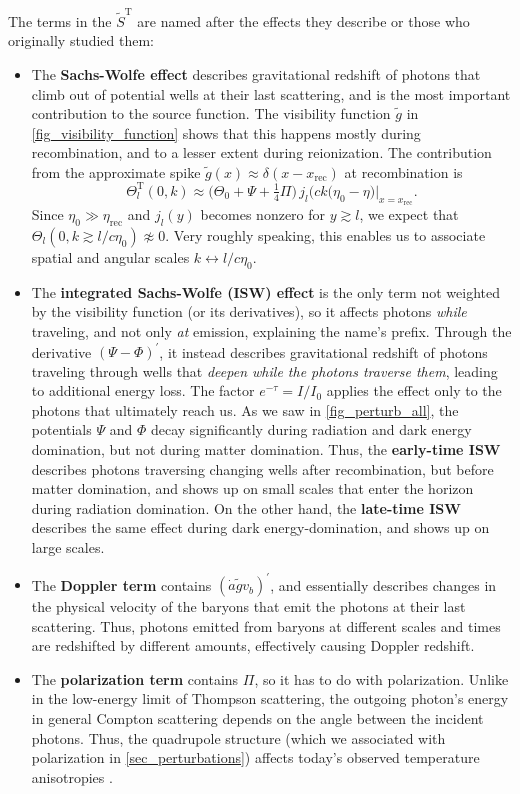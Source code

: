 \documentclass[10pt,a4paper]{article}
\begin{document}
The terms in the $\tilde{S}^\text{T}$ are named after the effects they describe or those who originally studied them:
\begin{itemize}
\item
The \textbf{Sachs-Wolfe effect} describes gravitational redshift of photons that climb out of potential wells at their last scattering,
and is the most important contribution to the source function.
The visibility function $\tilde{g}$ in \cref{fig_visibility_function} shows that this happens mostly during recombination,
and to a lesser extent during reionization.
The contribution from the approximate spike $\tilde{g}(x) \approx \delta(x-x_\text{rec})$ at recombination is
\begin{equation}
	\Theta^\text{T}_l(0,k) \approx \big(\Theta_0 + \Psi + \tfrac14 \Pi \big) \, j_l\big(ck(\eta_0-\eta\big) \Big|_{x=x_\text{rec}}.
\end{equation}
Since $\eta_0 \gg \eta_\text{rec}$ and $j_l(y)$ becomes nonzero for $y \gtrsim l$,
we expect that $\Theta_l(0,k \gtrsim l / c \eta_0) \not\approx 0$.
Very roughly speaking,
this enables us to associate spatial and angular scales $k \leftrightarrow l/c\eta_0$.

\item
The \textbf{integrated Sachs-Wolfe (ISW) effect} is the only term not weighted by the visibility function (or its derivatives),
so it affects photons \emph{while} traveling, and not only \emph{at} emission,
explaining the name's prefix.
Through the derivative $(\Psi-\Phi)^\prime$,
it instead describes gravitational redshift of photons traveling through wells that \emph{deepen while the photons traverse them},
leading to additional energy loss.
The factor $e^{-\tau} = I/I_0$ applies the effect only to the photons that ultimately reach us.
As we saw in \cref{fig_perturb_all}, the potentials $\Psi$ and $\Phi$ decay significantly during radiation and dark energy domination, but not during matter domination.
Thus, the \textbf{early-time ISW} describes photons traversing changing wells after recombination, but before matter domination, and shows up on small scales that enter the horizon during radiation domination.
On the other hand, the \textbf{late-time ISW} describes the same effect during dark energy-domination,
and shows up on large scales.

\item
The \textbf{Doppler term} contains $(\dot{a} \tilde{g} v_b)^\prime$,
and essentially describes changes in the physical velocity of the baryons that emit the photons at their last scattering.
Thus, photons emitted from baryons at different scales and times are redshifted by different amounts,
effectively causing Doppler redshift.

\item
The \textbf{polarization term} contains $\Pi$, so it has to do with polarization.
Unlike in the low-energy limit of Thompson scattering,
the outgoing photon's energy in general Compton scattering
depends on the angle between the incident photons.
Thus, the quadrupole structure (which we associated with polarization in \cref{sec_perturbations})
affects today's observed temperature anisotropies \cite{kableDeconstructingPlanckTT2020}.
\end{itemize}
\end{document}
